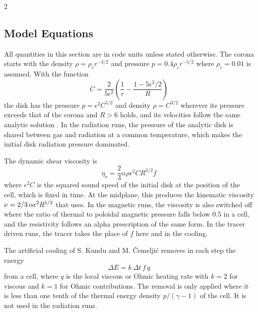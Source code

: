 	\begin{multicols}{2}

	\subsection{Model Equations}
	\label{app:equations}

	All quantities in this section are in code units unless stated otherwise. The corona starts with the density
	$\rho = \rho_c r^{-3/2}$ and pressure $p = 0.4 \rho_c r^{-5/2}$ where $\rho_c = 0.01$ is assumed. With the function
	\begin{equation}
		C = \frac{2}{5 \epsilon^2} \left(\frac{1}{r} - \frac{1 - 5 \epsilon^2 / 2}{R}\right)
	\end{equation}
	the disk has the pressure $p = \epsilon^2 C^{5/2}$ and density $\rho = C^{3/2}$ wherever its pressure exceeds that of the
	corona and $R > 6$ holds, and its velocities follow the same analytic solution \cite{kluz2000}. In the radiation runs,
	the pressure of the analytic disk is shared between gas and radiation at a common temperature, which makes the initial
	disk radiation pressure dominated.

	The dynamic shear viscosity is
	\begin{equation}
		\eta_\nu = \frac{2}{3} \alpha \rho \epsilon^2 C R^{3/2} f
	\end{equation}
	where $\epsilon^2 C$ is the squared sound speed of the initial disk at the position of the cell, which is fixed in time. At
	the midplane, this produces the kinematic viscosity $\nu = 2 / 3 \,\alpha \epsilon^2 R^{1{\kern-0.5pt}/2}$ that  uses.
	In the magnetic runs, the viscosity is also switched off where the ratio of thermal to poloidal magnetic pressure falls below
	\num{0.5} in a cell, and the resistivity follows an alpha prescription of the same form. In the tracer driven runs, the tracer takes
	the place of $f$ here and in the cooling.

	The artificial cooling of S. Kundu and M. Čemeljić removes in each step the energy
	\begin{equation}
		\Delta E = k \, \Delta t \, f \, q
	\end{equation}
	from a cell, where $q$ is the local viscous or Ohmic heating rate with $k = 2$ for viscous and $k = 1$ for Ohmic contributions.
	The removal is only applied where it is less than one tenth of the thermal energy density $p / (\gamma - 1)$ of the cell.
	It is not used in the radiation runs.


\end{multicols}
